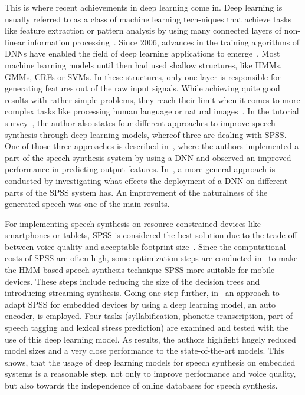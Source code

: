 This is where recent achievements in deep learning come in. Deep learning is usually referred to as a class of machine learning  tech-\break niques that achieve tasks like feature extraction or pattern analysis by using many connected layers of non-linear information processing~\cite{ling:deep, li:survey}. Since 2006, advances in the training algorithms of \acp{DNN} have enabled the field of deep learning applications to emerge~\cite{boros:robust}. Most machine learning models until then had used shallow structures, like \acp{HMM}, \acp{GMM}, \acp{CRF} or \acp{SVM}. In these structures, only one layer is responsible for generating features out of the raw input signals. While achieving quite good results with rather simple problems, they reach their limit when it comes to more complex tasks like processing human language or natural images~\cite{li:survey}. In the tutorial survey~\cite{li:survey}, the author also states four different approaches to improve speech synthesis through deep learning models, whereof three are dealing with \ac{SPSS}. One of those three approaches is described in~\cite{zen:deepstatistical}, where the authors implemented a part of the speech synthesis system by using a \ac{DNN} and observed an improved performance in predicting output features. In~\cite{hashimoto:effect}, a more general approach is conducted by investigating what effects the deployment of a \ac{DNN} on different parts of the \ac{SPSS} system has. An improvement of the naturalness of the generated speech was one of the main results.

For implementing speech synthesis on resource-constrained devices like smartphones or tablets, \ac{SPSS} is considered the best solution due to the trade-off between voice quality and acceptable footprint size~\cite{toth:optimizing}. Since the computational costs of \ac{SPSS} are often high, some optimization steps are conducted in~\cite{toth:optimizing} to make the \ac{HMM}-based speech synthesis technique \ac{SPSS} more suitable for mobile devices. These steps include reducing the size of the decision trees and introducing streaming synthesis. Going one step further, in~\cite{boros:robust} an approach to adapt \ac{SPSS} for embedded devices by using a deep learning model, an auto encoder, is employed. Four tasks (syllabification, phonetic transcription, part-of-speech tagging and lexical stress prediction) are examined and tested with the use of this deep learning model. As results, the authors highlight hugely reduced model sizes and a very close performance to the state-of-the-art models. This shows, that the usage of deep learning models for speech synthesis on embedded systems is a reasonable step, not only to improve performance and voice quality, but also towards the independence of online databases for speech synthesis.

